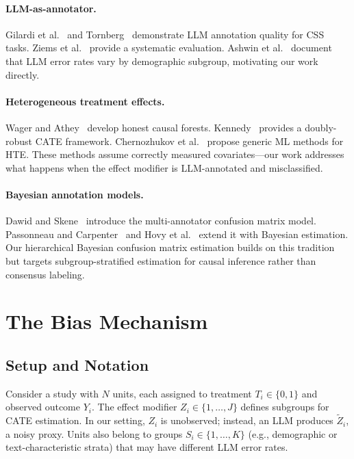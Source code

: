 \documentclass[11pt,a4paper]{article}
\begin{document}
\paragraph{LLM-as-annotator.}
Gilardi et al.~ and Tornberg~ demonstrate LLM annotation quality for CSS tasks.
Ziems et al.~ provide a systematic evaluation.
Ashwin et al.~ document that LLM error rates vary by demographic subgroup, motivating our work directly.

\paragraph{Heterogeneous treatment effects.}
Wager and Athey~ develop honest causal forests.
Kennedy~ provides a doubly-robust CATE framework.
Chernozhukov et al.~ propose generic ML methods for HTE.
These methods assume correctly measured covariates---our work addresses what happens when the effect modifier is LLM-annotated and misclassified.

\paragraph{Bayesian annotation models.}
Dawid and Skene~ introduce the multi-annotator confusion matrix model.
Passonneau and Carpenter~ and Hovy et al.~ extend it with Bayesian estimation.
Our hierarchical Bayesian confusion matrix estimation builds on this tradition but targets subgroup-stratified estimation for causal inference rather than consensus labeling.


\section{The Bias Mechanism}
\label{sec:mechanism}

\subsection{Setup and Notation}

Consider a study with $N$ units, each assigned to treatment $T_i \in \{0,1\}$ and observed outcome $Y_i$.
The effect modifier $Z_i \in \{1,\ldots,J\}$ defines subgroups for CATE estimation.
In our setting, $Z_i$ is unobserved; instead, an LLM produces $\tilde{Z}_i$, a noisy proxy.
Units also belong to groups $S_i \in \{1,\ldots,K\}$ (e.g., demographic or text-characteristic strata) that may have different LLM error rates.
\end{document}
